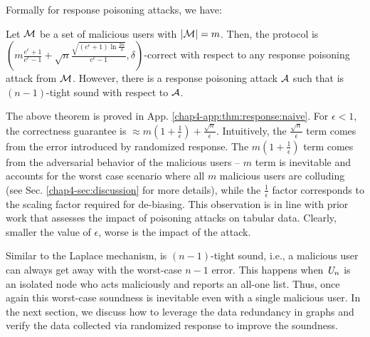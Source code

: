 
Formally
for response poisoning attacks, we have:
\begin{thm}\label{chap4-thm:b3a2_hard} 
Let $\mathcal{M}$ be a set of malicious users with $|\mathcal{M}| = m$. Then, 
the \DegRRNaive{} protocol is $(m\frac{e^\epsilon+1}{e^\epsilon-1}+\sqrt{n}\frac{\sqrt{(e^\epsilon+1)\ln\frac{2n}{\delta}}}{e^\epsilon-1},\delta)$-correct with respect to any response poisoning attack from $\mathcal{M}$. However, there is a response poisoning attack $\mathcal{A}$ such that \DegRRNaive{} is $(n-1)$-tight sound with respect to $\mathcal{A}$.
\label{chap4-thm:response:naive}\end{thm}
The above theorem is proved in App. \ref{chap4-app:thm:response:naive}.
For $\epsilon < 1$, the correctness guarantee is $\approx m(1+\frac{1}{\epsilon})+\frac{\sqrt{n}}{\epsilon}$. Intuitively, the $\frac{\sqrt{n}}{\epsilon}$ term comes from the error introduced by randomized response. The $m(1+\frac{1}{\epsilon})$ term comes from the adversarial behavior of the malicious users -- $m$ term is inevitable and 
 accounts for the worst case scenario where all $m$ malicious users are colluding  (see Sec. \ref{chap4-sec:discussion}  for more details), while the $\frac{1}{\epsilon}$ factor corresponds to the scaling factor required for de-biasing. This observation is in line with prior work \cite{Cheu21} that assesses the impact of poisoning attacks on tabular data.  Clearly, smaller the value of $\epsilon$, worse is the impact of the attack.   %


Similar to the Laplace mechanism, \DegRRNaive{} is $(n-1)$-tight sound, i.e., a malicious user can always get away with the worst-case $n-1$ error. This happens when $\textit{U}_n$ is an isolated node who acts maliciously and reports an all-one list. Thus, once again this  worst-case soundness is inevitable even with a single malicious user.   In the next section, we discuss how to leverage the data redundancy in graphs and verify the data collected via randomized response to improve the soundness.



